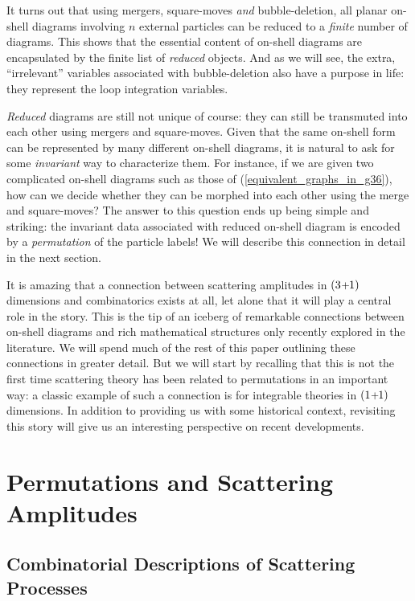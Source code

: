 \documentclass[12pt,hyperref,compress]{JHEP3}
\newcommand{\pl}{\hspace{0.5pt}\text{{\small+}}\hspace{-0.5pt}}
\begin{document}
It turns out that using mergers, square-moves {\it and} bubble-deletion, all planar on-shell diagrams involving $n$ external particles can be reduced to a {\it finite} number of diagrams. This shows that the essential content of on-shell diagrams are encapsulated by the finite list of {\it reduced} objects. And as we will see, the extra, ``irrelevant'' variables associated with bubble-deletion also have a purpose in life: they represent the loop integration variables.


{\it Reduced} diagrams are still not unique of course: they can still be transmuted into each other using mergers and square-moves. Given that the same on-shell form can be represented by many different on-shell diagrams, it is natural to ask for some  {\it invariant} way to characterize them. For instance, if we are given two complicated on-shell diagrams such as those of (\ref{equivalent_graphs_in_g36}), how can we decide whether they can be morphed into each other using the merge and square-moves? The answer  to this question ends up being simple and striking: the invariant data associated with reduced on-shell diagram is encoded by a {\it permutation} of the particle labels! We will describe this connection in detail in the next section.


It is amazing that a connection between scattering amplitudes in $(3\pl1)$ dimensions and combinatorics exists at all, let alone that it will play a central role in the story. This is the tip of an iceberg of remarkable connections between on-shell diagrams and rich mathematical structures only recently explored in the literature. We will spend much of the rest of this paper outlining these connections in greater detail. But we will start by recalling that this is not the first time scattering theory has been related to permutations in an important way: a classic example of such a connection is for integrable theories in $(1\pl1)$ dimensions. In addition to providing us with some historical context, revisiting this story will give us an interesting perspective on recent developments. 





\newpage
\section{Permutations and Scattering Amplitudes}\label{combinatorics_of_scattering_amplitudes_section}
\subsection{Combinatorial Descriptions of Scattering Processes}\label{combinatorial_descriptions_of_scattering_processes_subsection}
\end{document}
